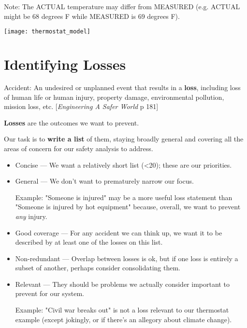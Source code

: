 \documentclass[letterpaper]{tufte-book}
\begin{document}
Note: The ACTUAL temperature may differ from MEASURED (e.g. ACTUAL might be 68 degrees F while MEASURED is 69 degrees F).


\begin{center}
\texttt{[image: thermostat\_model]}
\end{center}

\section{Identifying Losses}


Accident: An undesired or unplanned event that results in a \textbf{loss}, including loss of human life or human injury, property damage, environmental pollution, mission loss, etc. [\emph{Engineering A Safer World} p 181]

\textbf{Losses} are the outcomes we want to prevent.

Our task is to \textbf{write a list} of them, staying broadly general and covering all the areas of concern for our safety analysis to address.



\begin{itemize}
\setlength{\itemsep}{0pt}
\setlength{\parskip}{.25em}
\item Concise --- We want a relatively short list (<20); these are our priorities.
\item General --- We don't want to prematurely narrow our focus. 

Example: "Someone is injured" may be a more useful loss statement than "Someone is injured by hot equipment" because, overall, we want to prevent \emph{any} injury.
\item Good coverage --- For any accident we can think up, we want it to be described by at least one of the losses on this list.
\item Non-redundant --- Overlap between losses is ok, but if one loss is entirely a subset of another, perhaps consider consolidating them.
\item Relevant --- They should be problems we actually consider important to prevent for our system. 

Example: "Civil war breaks out" is not a loss relevant to our thermostat example (except jokingly, or if there's an allegory about climate change).
\end{itemize}  
 
\end{document}
